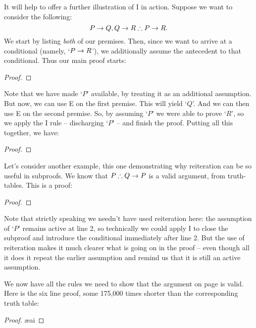 It will help to offer a further  illustration of {\eif}I in action. Suppose we want to consider the following:
	$$P \rightarrow Q, Q \rightarrow R \mathrel{\therefore} P \rightarrow R.$$
We start by listing \emph{both} of our premises. Then, since we want to arrive at a conditional (namely, `$P \rightarrow R$'), we additionally assume the antecedent to that conditional. Thus our main proof starts:
\begin{proof}
	\open
	\close
\end{proof}
Note that we have made `$P$' available, by treating it as an additional assumption. But now, we can use {\eif}E on the first premise. This will yield `$Q$'. And we can then use {\eif}E on the second premise. So, by assuming `$P$' we were able to prove `$R$', so we apply the {\eif}I rule – discharging `$P$' – and finish the proof. Putting all this together, we have:
\label{HSproof}
\begin{proof}
	\open
	\close
\end{proof}

Let's consider another example, this one demonstrating why reiteration can be so useful in subproofs. We know that $P \mathrel{\therefore} Q \rightarrow P$ is a valid argument, from truth-tables. This is a proof: \begin{proof}
	\open
	\close
\end{proof} Note that strictly speaking we needn't have used reiteration here: the assumption of `$P$' remains active at line 2, so technically we could apply {\eif}I to close the subproof and introduce the conditional immediately after line 2. But the use of reiteration makes it much clearer what is going on in the proof – even though all it does it repeat the earlier assumption and remind us that it is still an active assumption. 


We now have all the rules we need to show that the argument on page \pageref{longtt} is valid. Here is the six line proof,  some 175,000 times shorter  than the corresponding truth table:\label{ndshort}


\hspace{-3cm}	\begin{minipage}{\textwidth}\small\begin{proof}
	\open
		\ae{ai}
		\close
\end{proof}\end{minipage}


